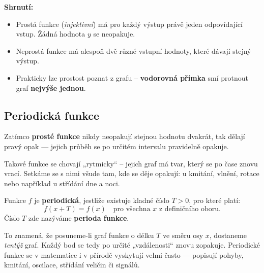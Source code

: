 \documentclass[12pt,a4paper]{article}
\begin{document}
\begin{notebox}
\textbf{Shrnutí:}
\begin{itemize}
    \item Prostá funkce (\textit{injektivní}) má pro každý výstup právě jeden odpovídající vstup.  
          Žádná hodnota \(y\) se neopakuje.
    \item Neprostá funkce má alespoň dvě různé vstupní hodnoty, které dávají stejný výstup.
    \item Prakticky lze prostost poznat z grafu – \textbf{vodorovná přímka} smí protnout graf \textbf{nejvýše jednou}.
\end{itemize}
\end{notebox}


\subsection*{Periodická funkce}

Zatímco \textbf{prosté funkce} nikdy neopakují stejnou hodnotu dvakrát, tak 
 dělají pravý opak — jejich průběh se po určitém intervalu pravidelně opakuje.  

Takové funkce se chovají „rytmicky“ – jejich graf má tvar, který se po čase znovu vrací.  
Setkáme se s nimi všude tam, kde se děje opakují: u kmitání, vlnění, rotace nebo například u střídání dne a noci.  



\begin{definitionbox}

Funkce \(f\) je \textbf{periodická}, jestliže existuje kladné číslo \(T > 0\), pro které platí:
\[
f(x + T) = f(x) \quad \text{pro všechna } x \text{ z definičního oboru.}
\]
Číslo \(T\) zde nazýváme \textbf{perioda funkce}.
\end{definitionbox}

To znamená, že posuneme-li graf funkce o délku \(T\) ve směru osy \(x\), dostaneme \emph{tentýž} graf.  
Každý bod se tedy po určité „vzdálenosti“ znovu zopakuje.  
Periodické funkce se v matematice i v přírodě vyskytují velmi často — popisují pohyby, kmitání, oscilace, střídání veličin či signálů.
\end{document}
